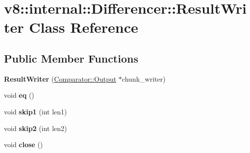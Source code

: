 \hypertarget{classv8_1_1internal_1_1_differencer_1_1_result_writer}{}\section{v8\+:\+:internal\+:\+:Differencer\+:\+:Result\+Writer Class Reference}
\label{classv8_1_1internal_1_1_differencer_1_1_result_writer}
\subsection*{Public Member Functions}
\begin{DoxyCompactItemize}
\item 
{\bfseries Result\+Writer} (\hyperlink{classv8_1_1internal_1_1_comparator_1_1_output}{Comparator\+::\+Output} $\ast$chunk\+\_\+writer)\hypertarget{classv8_1_1internal_1_1_differencer_1_1_result_writer_a7c3df15ec531f17fe0cf698e69be12a4}{}\label{classv8_1_1internal_1_1_differencer_1_1_result_writer_a7c3df15ec531f17fe0cf698e69be12a4}

\item 
void {\bfseries eq} ()\hypertarget{classv8_1_1internal_1_1_differencer_1_1_result_writer_a2e941297652e0e64024f9a1bd875302f}{}\label{classv8_1_1internal_1_1_differencer_1_1_result_writer_a2e941297652e0e64024f9a1bd875302f}

\item 
void {\bfseries skip1} (int len1)\hypertarget{classv8_1_1internal_1_1_differencer_1_1_result_writer_a95631f44d600899cf53e9bd163888f87}{}\label{classv8_1_1internal_1_1_differencer_1_1_result_writer_a95631f44d600899cf53e9bd163888f87}

\item 
void {\bfseries skip2} (int len2)\hypertarget{classv8_1_1internal_1_1_differencer_1_1_result_writer_a344740def2474e1c1d950eefc7af87ea}{}\label{classv8_1_1internal_1_1_differencer_1_1_result_writer_a344740def2474e1c1d950eefc7af87ea}

\item 
void {\bfseries close} ()\hypertarget{classv8_1_1internal_1_1_differencer_1_1_result_writer_a8f4d6e84cec727361298dbaccd08ebcc}{}\label{classv8_1_1internal_1_1_differencer_1_1_result_writer_a8f4d6e84cec727361298dbaccd08ebcc}

\end{DoxyCompactItemize}

